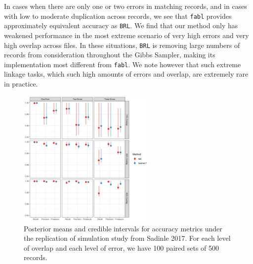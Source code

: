 \documentclass[12pt,letterpaper]{article}
\newcommand{\1}[1]{\mathbb{I}\!\left[#1\right]} %
\begin{document}
In cases when there are only one or two errors in matching records, and in cases with low to moderate duplication across records, we see that \texttt{fabl} provides approximately equivalent accuracy as \texttt{BRL}. 
We find that our method only has weakened performance in the
most extreme scenario of very high errors and very high overlap across
files. In these situations, \texttt{BRL} is removing large numbers of records from consideration throughout the Gibbs Sampler, making its implementation most different from \texttt{fabl}. We note however that such extreme linkage tasks, which such high amounts of errors and overlap, are extremely rare in practice. 

%	


\begin{figure}[ht]
	
	{\centering 
		
		\includegraphics[width=0.6\textwidth]{../notes/figures/sadinle_sim_plot} 
	}
	
	\caption{Posterior means and credible intervals for accuracy metrics under the replication of simulation study from Sadinle 2017. For each level of overlap and each level of error, we have 100 paired sets of 500 records.}\label{fig:sadinle_simulation}
	
\end{figure}
\end{document}
